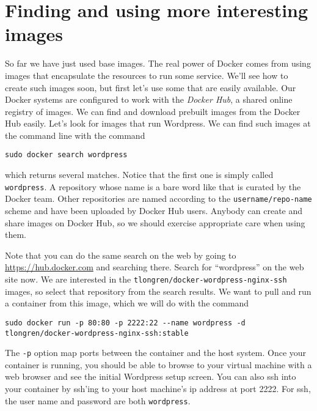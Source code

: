 \documentclass{article}
\begin{document}
\section{Finding and using more interesting images}
So far we have just used base images.  The real power of Docker comes from using images that encapsulate the resources to run some service.  We'll see how to create such images soon, but first let's use some that are easily available.  Our Docker systems are configured to work with the \emph{Docker Hub}, a shared online registry of images.  We can find and download prebuilt images from the Docker Hub easily.  Let's look for images that run Wordpress.  We can find such images at the command line with the command

\texttt{sudo docker search wordpress}

which returns several matches.  Notice that the first one is simply called \texttt{wordpress}.  A repository whose name is a bare word like that is curated by the Docker team.  Other repositories are named according to the \texttt{username/repo-name} scheme and have been uploaded by Docker Hub users. Anybody can create and share images on Docker Hub, so we should exercise appropriate care when using them.

Note that you can do the same search on the web by going to \url{https://hub.docker.com} and searching there.  Search for ``wordpress'' on the web site now.  We are interested in the \texttt{tlongren/docker-wordpress-nginx-ssh} images, so select that repository from the search results.  We want to pull and run a container from this image, which we will do with the command
\begin{verbatim}
sudo docker run -p 80:80 -p 2222:22 --name wordpress -d tlongren/docker-wordpress-nginx-ssh:stable
\end{verbatim}

The \texttt{-p} option map ports between the container and the host system. Once your container is running, you should be able to browse to your virtual machine with a web browser and see the initial Wordpress setup screen.  You can also ssh into your container by ssh'ing to your host machine's ip address at port 2222.  For ssh, the user name and password are both \texttt{wordpress}.
\end{document}
